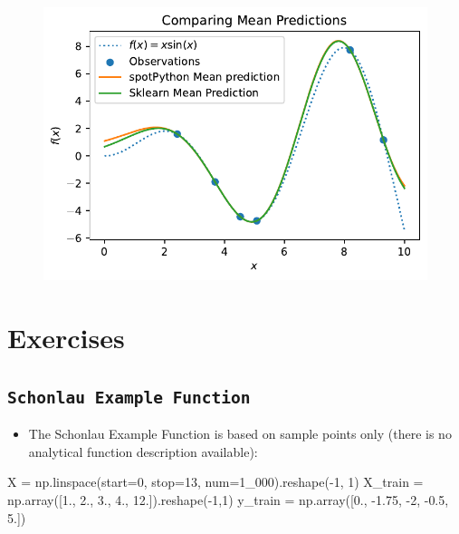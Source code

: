 \documentclass[
  letterpaper,
  DIV=11,
  numbers=noendperiod]{scrreprt}
\newenvironment{Shaded}{\begin{snugshade}}{\end{snugshade}}
\newcommand{\DecValTok}[1]{\textcolor[rgb]{0.68,0.00,0.00}{#1}}
\newcommand{\FloatTok}[1]{\textcolor[rgb]{0.68,0.00,0.00}{#1}}
\newcommand{\NormalTok}[1]{\textcolor[rgb]{0.00,0.23,0.31}{#1}}
\newcommand{\OperatorTok}[1]{\textcolor[rgb]{0.37,0.37,0.37}{#1}}
\providecommand{\tightlist}{%
  \setlength{\itemsep}{0pt}\setlength{\parskip}{0pt}}\usepackage{longtable,booktabs,array}
\begin{document}
\begin{figure}[H]

{\centering \includegraphics{011_num_spot_sklearn_gaussian_files/figure-pdf/cell-8-output-1.pdf}

}

\end{figure}

\hypertarget{exercises-5}{%
\section{Exercises}\label{exercises-5}}

\hypertarget{schonlau-example-function}{%
\subsection{\texorpdfstring{\texttt{Schonlau\ Example\ Function}}{Schonlau Example Function}}\label{schonlau-example-function}}

\begin{itemize}
\tightlist
\item
  The Schonlau Example Function is based on sample points only (there is
  no analytical function description available):
\end{itemize}

\begin{Shaded}
\begin{Highlighting}[]
\NormalTok{X }\OperatorTok{=}\NormalTok{ np.linspace(start}\OperatorTok{=}\DecValTok{0}\NormalTok{, stop}\OperatorTok{=}\DecValTok{13}\NormalTok{, num}\OperatorTok{=}\DecValTok{1\_000}\NormalTok{).reshape(}\OperatorTok{{-}}\DecValTok{1}\NormalTok{, }\DecValTok{1}\NormalTok{)}
\NormalTok{X\_train }\OperatorTok{=}\NormalTok{ np.array([}\FloatTok{1.}\NormalTok{, }\FloatTok{2.}\NormalTok{, }\FloatTok{3.}\NormalTok{, }\FloatTok{4.}\NormalTok{, }\FloatTok{12.}\NormalTok{]).reshape(}\OperatorTok{{-}}\DecValTok{1}\NormalTok{,}\DecValTok{1}\NormalTok{)}
\NormalTok{y\_train }\OperatorTok{=}\NormalTok{ np.array([}\FloatTok{0.}\NormalTok{, }\OperatorTok{{-}}\FloatTok{1.75}\NormalTok{, }\OperatorTok{{-}}\DecValTok{2}\NormalTok{, }\OperatorTok{{-}}\FloatTok{0.5}\NormalTok{, }\FloatTok{5.}\NormalTok{])}
\end{Highlighting}
\end{Shaded}
\end{document}
